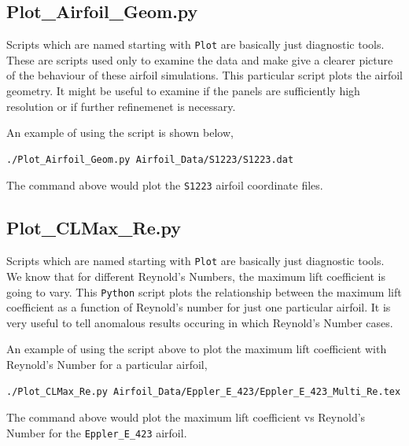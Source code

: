 \subsection{Plot\_Airfoil\_Geom.py}

Scripts which are named starting with \texttt{Plot} are basically just diagnostic tools. These are scripts used only to examine the data and make give a clearer picture of the behaviour of these airfoil simulations. This particular script plots the airfoil geometry. It might be useful to examine if the panels are sufficiently high resolution or if further refinemenet is necessary.

$$$$
An example of using the script is shown below,
\begin{lstlisting}
./Plot_Airfoil_Geom.py Airfoil_Data/S1223/S1223.dat
\end{lstlisting}
The command above would plot the \texttt{S1223} airfoil coordinate files.

\subsection{Plot\_CLMax\_Re.py}

Scripts which are named starting with \texttt{Plot} are basically just diagnostic tools. We know that for different Reynold's Numbers, the maximum lift coefficient is going to vary. This \texttt{Python} script plots the relationship between the maximum lift coefficient as a function of Reynold's number for just one particular airfoil. It is very useful to tell anomalous results occuring in which Reynold's Number cases.

$$$$
An example of using the script above to plot the maximum lift coefficient with Reynold's Number for a particular airfoil,
\begin{lstlisting}
./Plot_CLMax_Re.py Airfoil_Data/Eppler_E_423/Eppler_E_423_Multi_Re.tex
\end{lstlisting}
The command above would plot the maximum lift coefficient vs Reynold's Number for the \texttt{Eppler\_E\_423} airfoil.

